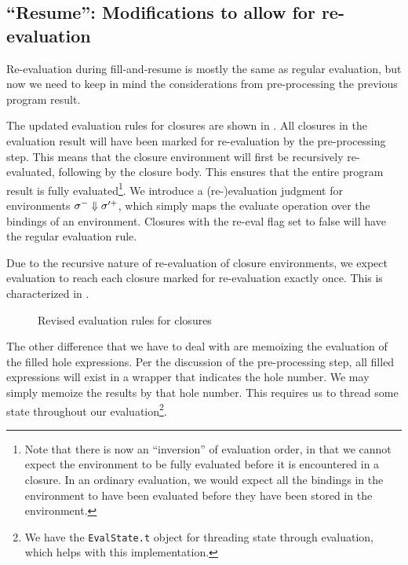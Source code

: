 \subsection{``Resume'': Modifications to allow for re-evaluation}
\label{sec:re-eval}

Re-evaluation during fill-and-resume is mostly the same as regular evaluation, but now we need to keep in mind the considerations from pre-processing the previous program result.

The updated evaluation rules for closures are shown in . All closures in the evaluation result will have been marked for re-evaluation by the pre-processing step. This means that the closure environment will first be recursively re-evaluated, following by the closure body. This ensures that the entire program result is fully evaluated\footnote{Note that there is now an ``inversion'' of evaluation order, in that we cannot expect the environment to be fully evaluated before it is encountered in a closure. In an ordinary evaluation, we would expect all the bindings in the environment to have been evaluated before they have been stored in the environment.}. We introduce a (re-)evaluation judgment for environments $\sigma^-\Downarrow\sigma'^+$, which simply maps the evaluate operation over the bindings of an environment. Closures with the re-eval flag set to false will have the regular evaluation rule.

Due to the recursive nature of re-evaluation of closure environments, we expect evaluation to reach each closure marked for re-evaluation exactly once. This is characterized in .

\begin{figure}
  \centering
  \begin{mdframed}
    \begin{singlespace}
      
    \end{singlespace}
  \end{mdframed}
  \caption{Revised evaluation rules for closures}
  \label{fig:reeval-closures}
\end{figure}

The other difference that we have to deal with are memoizing the evaluation of the filled hole expressions. Per the discussion of the pre-processing step, all filled expressions will exist in a wrapper that indicates the hole number. We may simply memoize the results by that hole number. This requires us to thread some state throughout our evaluation\footnote{We have the \texttt{EvalState.t} object for threading state through evaluation, which helps with this implementation.}.

